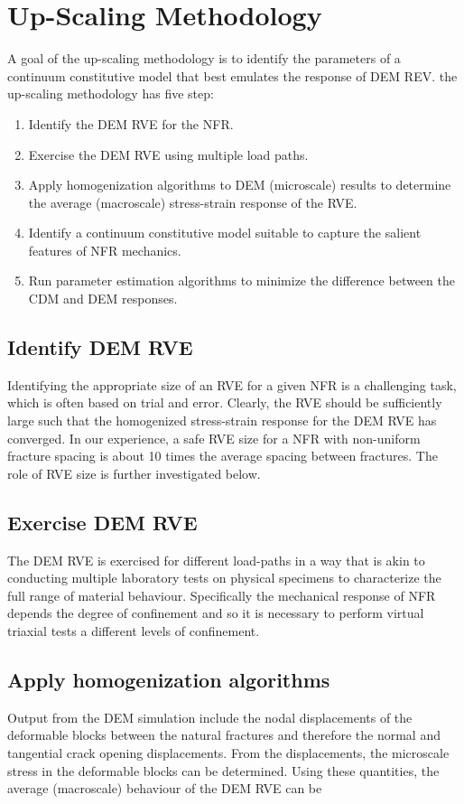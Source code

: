 \section{Up-Scaling Methodology}
A goal of the up-scaling methodology is to identify the parameters of a continuum constitutive model that best emulates the response of DEM REV. the up-scaling methodology has five step: 
\begin{enumerate}
    \item Identify the DEM RVE for the NFR.
	\item Exercise the  DEM RVE using multiple load paths.
	\item Apply homogenization algorithms to DEM (microscale) results to determine the average (macroscale) stress-strain response of the RVE.
	\item Identify a continuum constitutive model suitable to capture the salient features of NFR mechanics.
	\item Run parameter estimation algorithms to minimize the difference between the CDM and DEM responses.
\end{enumerate}

\subsection*{Identify DEM RVE}
Identifying the appropriate size of an RVE for a given NFR is a challenging task, which is often based on trial and error. Clearly, the RVE should be sufficiently large such that the homogenized stress-strain response for the DEM RVE has converged. In our experience, a safe RVE size for a NFR with non-uniform fracture spacing is about 10 times the average spacing between fractures. The role of RVE size is further investigated below.

\subsection*{Exercise DEM RVE}
The DEM RVE is exercised for different load-paths in a way that is akin  to conducting multiple laboratory tests on physical specimens to characterize the full range of material behaviour. Specifically the mechanical response of NFR depends the degree of confinement and so it is necessary to perform virtual triaxial tests a different levels of confinement. 

\subsection*{Apply homogenization algorithms}
Output from the DEM simulation include the nodal displacements of the deformable blocks between the natural fractures and therefore the normal and tangential crack opening displacements. From the displacements, the microscale stress in the deformable blocks can be determined.  Using these quantities, the average (macroscale) behaviour of the DEM RVE can be  
